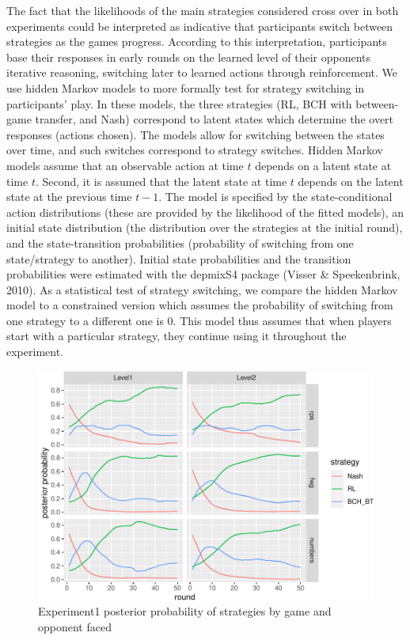 \documentclass[
  english,
  man,floatsintext]{apa6}
\begin{document}
The fact that the likelihoods of the main strategies considered cross over in both experiments could be interpreted as indicative that participants switch between strategies as the games progress. According to this interpretation, participants base their responses in early rounds on the learned level of their opponents iterative reasoning, switching later to learned actions through reinforcement.
We use hidden Markov models to more formally test for strategy switching in participants' play. In these models, the three strategies (RL, BCH with between-game transfer, and Nash) correspond to latent states which determine the overt responses (actions chosen). The models allow for switching between the states over time, and such switches correspond to strategy switches. Hidden Markov models assume that an observable action at time \(t\) depends on a latent state at time \(t\). Second, it is assumed that the latent state at time \(t\) depends on the latent state at the previous time \(t-1\). The model is specified by the state-conditional action distributions (these are provided by the likelihood of the fitted models), an initial state distribution (the distribution over the strategies at the initial round), and the state-transition probabilities (probability of switching from one state/strategy to another). Initial state probabilities and the transition probabilities were estimated with the depmixS4 package (Visser \& Speekenbrink, 2010). As a statistical test of strategy switching, we compare the hidden Markov model to a constrained version which assumes the probability of switching from one strategy to a different one is 0. This model thus assumes that when players start with a particular strategy, they continue using it throughout the experiment.

\begin{figure}

{\centering \includegraphics{paper_draft_2021_files/figure-latex/exp1-posteriors-plot-1} 

}

\caption{Experiment1 posterior probability of strategies by game and opponent faced}\label{fig:exp1-posteriors-plot}
\end{figure}
\end{document}

